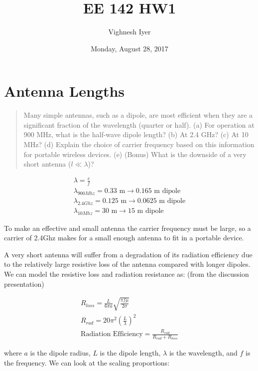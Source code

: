 \documentclass[11pt]{article}
\begin{document}
\title{EE 142 HW1}

\author{Vighnesh Iyer}
\date{Monday, August 28, 2017}
\maketitle

\section{Antenna Lengths}
\begin{quote}
	Many simple antennas, such as a dipole, are most efficient when they are a significant fraction of the wavelength (quarter or half). (a) For operation at 900 MHz, what is the half-wave dipole length? (b) At 2.4 GHz? (c) At 10 MHz? (d) Explain the choice	of carrier frequency based on this information for portable wireless devices. (e) (Bonus) What is the downside of a very short antenna ($l \ll \lambda$)?
\end{quote}

\begin{eqnarray}
	\lambda = \frac{c}{f} \nonumber \\
	\lambda_{900Mhz} = 0.33 \text{ m} \rightarrow \text{0.165 m dipole} \nonumber \\
	\lambda_{2.4Ghz} = 0.125 \text{ m} \rightarrow \text{0.0625 m dipole} \nonumber \\
	\lambda_{10Mhz} = 30 \text{ m} \rightarrow \text{15 m dipole} \nonumber
\end{eqnarray}

To make an effective and small antenna the carrier frequency must be large, so a carrier of 2.4Ghz makes for a small enough antenna to fit in a portable device.

A very short antenna will suffer from a degradation of its radiation efficiency due to the relatively large resistive loss of the antenna compared with longer dipoles. We can model the resistive loss and radiation resistance as: (from the discussion presentation)

\begin{eqnarray}
	R_{loss} = \frac{L}{6 \pi a} \sqrt{\frac{\pi f \mu}{2 \sigma}} \nonumber \\
	R_{rad} = 20 \pi^2 (\frac{L}{\lambda})^2 \nonumber \\
	\text{Radiation Efficiency} = \frac{R_{rad}}{R_{rad} + R_{loss}} \nonumber
\end{eqnarray}

where $a$ is the dipole radius, $L$ is the dipole length, $\lambda$ is the wavelength, and $f$ is the frequency. We can look at the scaling proportions:
\end{document}
